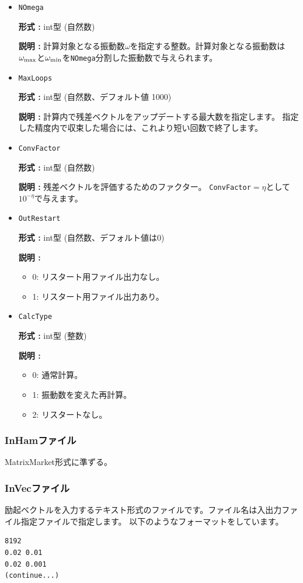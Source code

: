 \documentclass[12pt,titlepage]{jarticle}
\begin{document}
\begin{itemize}
 \item  \verb|NOmega|

{\bf 形式 :} int型 (自然数)

{\bf 説明 :} 計算対象となる振動数$\omega$を指定する整数。計算対象となる振動数は$\omega_{\rm max}$と$\omega_{\rm min}$を\verb|NOmega|分割した振動数で与えられます。

 \item  \verb|MaxLoops|

{\bf 形式 :} int型 (自然数、デフォルト値 1000)

{\bf 説明 :} 計算内で残差ベクトルをアップデートする最大数を指定します。
指定した精度内で収束した場合には、これより短い回数で終了します。

 \item  \verb|ConvFactor|

{\bf 形式 :} int型 (自然数)

{\bf 説明 :}  残差ベクトルを評価するためのファクター。 \verb|ConvFactor|$=\eta$として$10^{-\eta}$で与えます。

\item  \verb|OutRestart|

{\bf 形式 :} int型 (自然数、デフォルト値は0)

{\bf 説明 :} 
\begin{itemize}
\item{0: リスタート用ファイル出力なし。}
\item{1: リスタート用ファイル出力あり。}
\end{itemize}


 \item  \verb|CalcType|

{\bf 形式 :} int型 (整数)

{\bf 説明 :} 
\begin{itemize}
\item{0: 通常計算。}
\item{1: 振動数を変えた再計算。}
\item{2: リスタートなし。}
\end{itemize}


\end{itemize}
  
\newpage
\subsubsection{InHamファイル} \label{subsubsec:ham}
MatrixMarket形式に準ずる。

\subsubsection{InVecファイル}\label{subsubsec:vec}
励起ベクトルを入力するテキスト形式のファイルです。ファイル名は入出力ファイル指定ファイルで指定します。
以下のようなフォーマットをしています。
\\
\begin{minipage}{10cm}
\begin{screen}
\begin{verbatim}
8192
0.02 0.01
0.02 0.001
(continue...)
\end{verbatim}
\end{screen}
\end{minipage}
\end{document}
